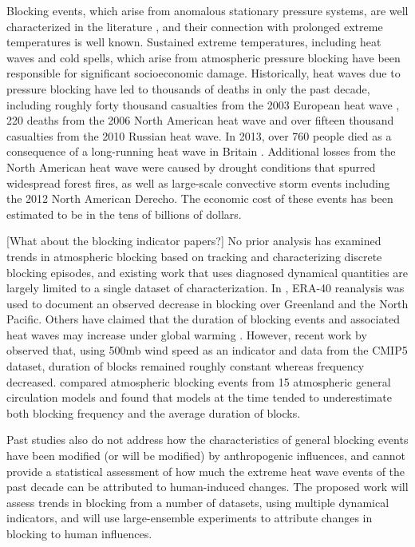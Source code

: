 \documentclass[11pt]{article}
\begin{document}
Blocking events, which arise from anomalous stationary pressure systems, are well characterized in the literature \citep{benzi1986anomalous}, and their connection with prolonged extreme temperatures is well known.  Sustained extreme temperatures, including heat waves and cold spells, which arise from atmospheric pressure blocking have been responsible for significant socioeconomic damage.  Historically, heat waves due to pressure blocking have led to thousands of deaths  in only the past decade, including roughly forty thousand casualties from the 2003 European heat wave \citep{bouchama20042003}, 220 deaths from the 2006 North American heat wave and over fifteen thousand casualties from the 2010 Russian heat wave.  In 2013, over 760 people died as a consequence of a long-running heat wave in Britain \citep{upi2013article}.  Additional losses from the North American heat wave were caused by drought conditions that spurred widespread forest fires, as well as large-scale convective storm events including the 2012 North American Derecho.  The economic cost of these events has been estimated to be in the tens of billions of dollars.

{\color{red}[What about the blocking indicator papers?]}
No prior analysis has examined trends in atmospheric blocking based on tracking and characterizing discrete blocking episodes, and existing work that uses diagnosed dynamical quantities are largely limited to a single dataset of characterization.  In \cite{croci2007multifaceted}, ERA-40 reanalysis was used to document an observed decrease in blocking over Greenland and the North Pacific.  Others have claimed that the duration of blocking events and associated heat waves may increase under global warming \citep{lupo1997climatological, beniston20042003}.  However, recent work by \cite{barnes2012methodology} observed that, using 500mb wind speed as an indicator and data from the CMIP5 dataset, duration of blocks remained roughly constant whereas frequency decreased.  \cite{dandrea1998northern} compared atmospheric blocking events from 15 atmospheric general circulation models and found that models at the time tended to underestimate both blocking frequency and the average duration of blocks.

Past studies also do not address how the characteristics of general blocking events have been modified (or will be modified) by anthropogenic influences, and cannot provide a statistical assessment of how much the extreme heat wave events of the past decade can be attributed to human-induced changes.  The proposed work will assess trends in blocking from a number of datasets, using multiple dynamical indicators, and will use large-ensemble experiments to attribute changes in blocking to human influences.
\end{document}
